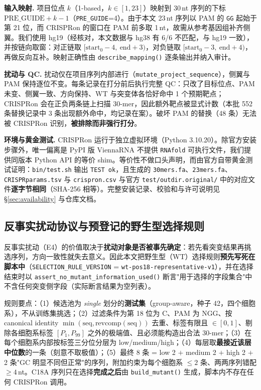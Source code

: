 \textbf{输入映射.} 项目位点 $k$（1-based，$k\in[1,23]$）映射到 30\,nt 序列的下标 $\mathrm{PRE\_GUIDE}+k-1$（\texttt{PRE\_GUIDE}=4）。由于本文 23\,nt 序列以 PAM 的 \texttt{GG} 起始于第 21 位，而 CRISPRon 的窗口在 PAM 前多取 1\,nt，故需从参考基因组补齐侧翼。我们使用 hg19（经核对，本文数据与 hg38 有 6/6 不匹配，与 hg19 一致），并按链向取窗：对正链取 $[\text{start}_0-4,\ \text{end}+3)$，对负链取 $[\text{start}_0-3,\ \text{end}+4)$，再做反向互补。映射正确性由 \texttt{describe\_mapping()} 逐条输出并纳入审计。

\textbf{扰动与 QC.} 扰动仅在项目序列内部进行（\texttt{mutate\_project\_sequence}），侧翼与 PAM 保持逐位不变。每条记录在打分前后执行完整 QC：只改了目标位点、PAM 未变、侧翼一致、方向保持、WT 与突变体各恰好命中 1 个预期靶点；CRISPRon 会在正负两条链上扫描 30-mer，因此额外靶点被显式计数（本批 552 条替换记录中 3 条出现额外命中，均记录在案）。破坏 PAM 的替换（48 条）无法被 CRISPRon 识别，\textbf{被排除而非强行打分}。

\textbf{环境与黄金测试.} CRISPRon 运行于独立虚拟环境（Python 3.10.20）。除官方安装步骤外，唯一偏离是 PyPI 版 ViennaRNA 不提供 \texttt{RNAfold} 可执行文件，我们提供同版本 Python API 的等价 shim。等价性不做口头声明，而由官方自带黄金测试证明：\texttt{bin/test.sh} 输出 \texttt{TEST ok}，且生成的 \texttt{30mers.fa}、\texttt{23mers.fa}、\texttt{CRISPRparams.tsv} 与 \texttt{crispron.csv} 与官方 \texttt{test/outdir.original/} 中的对应文件\textbf{逐字节相同}（SHA-256 相等）。完整安装记录、校验和与许可说明见 \S\ref{sec:availability} 与仓库文档。

\subsection{反事实扰动协议与预登记的野生型选择规则}
\label{sec:methods-counterfactual}

反事实扰动（E4）的价值取决于\textbf{扰动对象是否被事先确定}：若先看突变结果再挑选序列，方向一致性就失去意义。因此本文把野生型（WT）选择规则\textbf{预先写死在脚本中}（\texttt{SELECTION\_RULE\_VERSION} = \texttt{wt-pos18-representative-v1}），并在选择结束时以 \texttt{assert\_no\_mutant\_information\_used()} 断言"用于选择的字段集合"中不含任何突变侧字段（实际断言结果为空列表）。

规则要点：（1）候选池为 \emph{single} 划分的\textbf{测试集}（group-aware，种子 42，四个细胞系），不从训练集挑选；（2）过滤条件为第 18 位为 C、PAM 为 NGG、按 canonical identity $\min(\text{seq},\text{revcomp}(\text{seq}))$ 去重、标签有限且 $\in[0,1]$、剔除各细胞系标签 $[P_1,P_{99}]$ 之外的极端值、且必须能构造出合法 30-mer；（3）在每个细胞系内部按标签三分位分层为 low/medium/high；（4）每层取\textbf{最接近该层中位数}的一条（刻意不取极值）；（5）最终 8 条 = low 2 $+$ medium 2 $+$ high 2 $+$ 2 条"GC 明显不同但正常"的序列，附加约束为每个细胞系 $\le2$ 条、两两序列错配 $\ge4$\,nt。C18A 序列只在选择\textbf{完成之后}由 \texttt{build\_mutant()} 生成，脚本内不存在任何 CRISPRon 调用。

